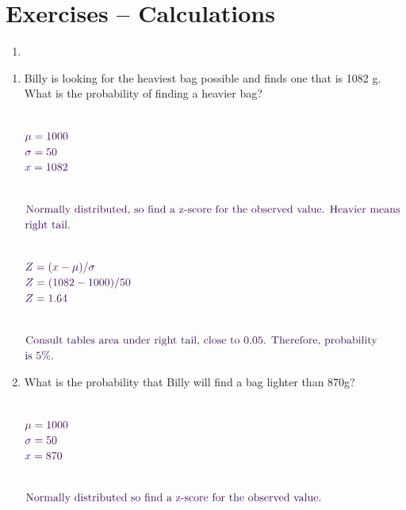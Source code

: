 \documentclass[12pt,a4paper]{article}
\providecommand{\tightlist}{%
  \setlength{\itemsep}{0pt}\setlength{\parskip}{0pt}}
\begin{document}
\onehalfspacing

\section*{Exercises -- Calculations}\label{exercises-calculations}

\begin{enumerate}
\def\labelenumi{\arabic{enumi}.}
\tightlist
\item
\end{enumerate}

\begin{enumerate}
\def\labelenumi{\alph{enumi}.}
\item
  Billy is looking for the heaviest bag possible and finds one that is
  1082 g. What is the probability of finding a heavier bag?\\
  \strut ~\\
  \(\color{waraubergine}\mu = 1000\)\\
  \(\color{waraubergine}\sigma = 50\)\\
  \(\color{waraubergine}x = 1082\)\\
  \strut ~\\
  \(\color{waraubergine}\text{Normally distributed, so find a z-score for the observed value. Heavier means }\)\\
  \(\color{waraubergine}\text{right tail.}\)\\
  \strut ~\\
  \(\color{waraubergine}Z = (x - \mu) / \sigma\)\\
  \(\color{waraubergine}Z = (1082 - 1000) / 50\)\\
  \(\color{waraubergine}Z =  1.64\)\\
  \strut ~\\
  \(\color{waraubergine}\text{Consult tables area under right tail, close to 0.05. Therefore, probability}\)
  \(\color{waraubergine}\text{is 5\%.}\)
\item
  What is the probability that Billy will find a bag lighter than
  870g?\\
  \strut ~\\
  \(\color{waraubergine}\mu = 1000\)\\
  \(\color{waraubergine}\sigma = 50\)\\
  \(\color{waraubergine}x = 870\)\\
  \strut ~\\
  \(\color{waraubergine}\text{Normally distributed so find a z-score for the observed value.}\)\\

\end{enumerate}
\end{document}
